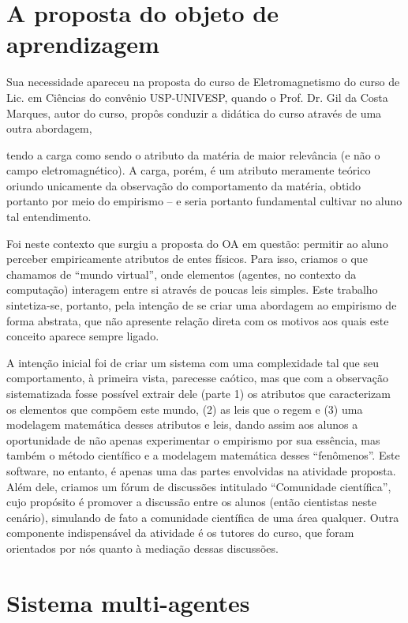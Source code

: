 \documentclass{article}
\begin{document}
\section{A proposta do objeto de aprendizagem}

Sua necessidade apareceu na proposta do curso de Eletromagnetismo do curso de Lic.
em Ciências do convênio USP-UNIVESP, quando o Prof. Dr. Gil da Costa Marques,
autor do curso, propôs conduzir a didática do curso através de uma outra abordagem,

tendo a carga como sendo o atributo da matéria de maior relevância (e não o campo
eletromagnético). A carga, porém, é um atributo meramente teórico oriundo unicamente
da observação do comportamento da matéria, obtido portanto por meio do empirismo –
e seria portanto fundamental cultivar no aluno tal entendimento.

Foi neste contexto que surgiu a proposta do OA em questão: permitir ao aluno
perceber empiricamente atributos de entes físicos. Para isso, criamos o que chamamos
de “mundo virtual”, onde elementos (agentes, no contexto da computação) interagem
entre si através de poucas leis simples. Este trabalho sintetiza-se, portanto, pela intenção
de se criar uma abordagem ao empirismo de forma abstrata, que não apresente relação
direta com os motivos aos quais este conceito aparece sempre ligado.

A intenção inicial foi de criar um sistema com uma complexidade tal que seu
comportamento, à primeira vista, parecesse caótico, mas que com a observação
sistematizada fosse possível extrair dele (parte 1) os atributos que caracterizam os
elementos que compõem este mundo, (2) as leis que o regem e (3) uma modelagem
matemática desses atributos e leis, dando assim aos alunos a oportunidade de não
apenas experimentar o empirismo por sua essência, mas também o método científico e a
modelagem matemática desses “fenômenos”. Este software, no entanto, é apenas uma
das partes envolvidas na atividade proposta. Além dele, criamos um fórum de
discussões intitulado “Comunidade científica”, cujo propósito é promover a discussão
entre os alunos (então cientistas neste cenário), simulando de fato a comunidade
científica de uma área qualquer. Outra componente indispensável da atividade é os
tutores do curso, que foram orientados por nós quanto à mediação dessas discussões.

\section{Sistema multi-agentes}
\end{document}
